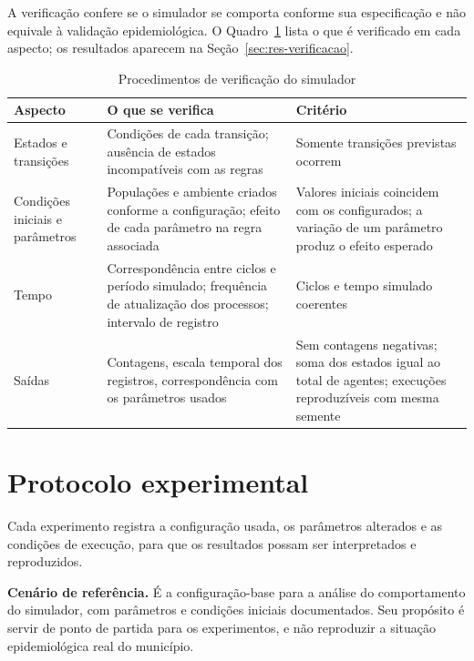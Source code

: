 A verificação confere se o simulador se comporta conforme sua especificação e não equivale à validação epidemiológica. O Quadro~\ref{tab:verificacao} lista o que é verificado em cada aspecto; os resultados aparecem na Seção~\ref{sec:res-verificacao}.

\begin{table}[htb]
    \centering
    \caption{Procedimentos de verificação do simulador}
    \label{tab:verificacao}
    \begin{tabular}{p{3.4cm} p{5.6cm} p{4.8cm}}
        \hline
        \textbf{Aspecto} & \textbf{O que se verifica} & \textbf{Critério} \\
        \hline
        Estados e transições & Condições de cada transição; ausência de estados incompatíveis com as regras & Somente transições previstas ocorrem \\
        Condições iniciais e parâmetros & Populações e ambiente criados conforme a configuração; efeito de cada parâmetro na regra associada & Valores iniciais coincidem com os configurados; a variação de um parâmetro produz o efeito esperado \\
        Tempo & Correspondência entre ciclos e período simulado; frequência de atualização dos processos; intervalo de registro & Ciclos e tempo simulado coerentes \\
        Saídas & Contagens, escala temporal dos registros, correspondência com os parâmetros usados & Sem contagens negativas; soma dos estados igual ao total de agentes; execuções reproduzíveis com mesma semente \\
        \hline
    \end{tabular}
\end{table}

\section{Protocolo experimental}
\label{sec:protocolo}

Cada experimento registra a configuração usada, os parâmetros alterados e as condições de execução, para que os resultados possam ser interpretados e reproduzidos.

\textbf{Cenário de referência.} É a configuração-base para a análise do comportamento do simulador, com parâmetros e condições iniciais documentados. Seu propósito é servir de ponto de partida para os experimentos, e não reproduzir a situação epidemiológica real do município.

